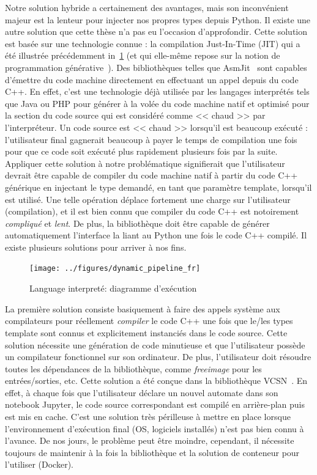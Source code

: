Notre solution hybride a certainement des avantages, mais son inconvénient majeur est la lenteur pour injecter nos
propres types depuis Python. Il existe une autre solution que cette thèse n'a pas eu l'occasion d'approfondir. Cette
solution est basée sur une technologie connue : la compilation Just-In-Time (JIT) qui a été illustrée précédemment
in~\cref{resume:fig:static.dynamic.dynamic.pipeline} (et qui elle-même repose sur la notion de programmation
générative~\parencite{czarnecki.2000.generative}). Des bibliothèques telles que AsmJit~\parencite{kobalicek.2011.asmjit}
sont capables d'émettre du code machine directement en effectuant un appel depuis du code C++. En effet, c'est une
technologie déjà utilisée par les langages interprétés tels que Java ou PHP pour générer à la volée du code machine
natif et optimisé pour la section du code source qui est considéré comme << chaud >> par l'interpréteur. Un code source
est << chaud >> lorsqu'il est beaucoup exécuté : l'utilisateur final gagnerait beaucoup à payer le temps de compilation
une fois pour que ce code soit exécuté plus rapidement plusieurs fois par la suite. Appliquer cette solution à notre
problématique signifierait que l'utilisateur devrait être capable de compiler du code machine natif à partir du code C++
générique en injectant le type demandé, en tant que paramètre template, lorsqu'il est utilisé. Une telle opération
déplace fortement une charge sur l'utilisateur (compilation), et il est bien connu que compiler du code C++ est
notoirement \emph{compliqué} et \emph{lent}. De plus, la bibliothèque doit être capable de générer automatiquement
l'interface la liant au Python une fois le code C++ compilé. Il existe plusieurs solutions pour arriver à nos fins.

\begin{figure}[htbp]
  \centering
  \texttt{[image: ../figures/dynamic\_pipeline\_fr]}
  \caption{Language interpreté: diagramme d'exécution}
  \label{resume:fig:static.dynamic.dynamic.pipeline}
\end{figure}

La première solution consiste basiquement à faire des appels système aux compilateurs pour réellement \emph{compiler} le
code C++ une fois que le/les types template sont connus et explicitement instanciés dans le code source. Cette solution
nécessite une génération de code minutieuse et que l'utilisateur possède un compilateur fonctionnel sur son ordinateur.
De plus, l'utilisateur doit résoudre toutes les dépendances de la bibliothèque, comme \emph{freeimage} pour les
entrées/sorties, etc. Cette solution a été conçue dans la bibliothèque VCSN~\parencite{demaille.2013.vcsn}. En effet, à
chaque fois que l'utilisateur déclare un nouvel automate dans son notebook Jupyter, le code source correspondant est
compilé en arrière-plan puis est mis en cache. C'est une solution très périlleuse à mettre en place lorsque
l'environnement d'exécution final (OS, logiciels installés) n'est pas bien connu à l'avance. De nos jours, le problème
peut être moindre, cependant, il nécessite toujours de maintenir à la fois la bibliothèque et la solution de conteneur
pour l'utiliser (Docker).

